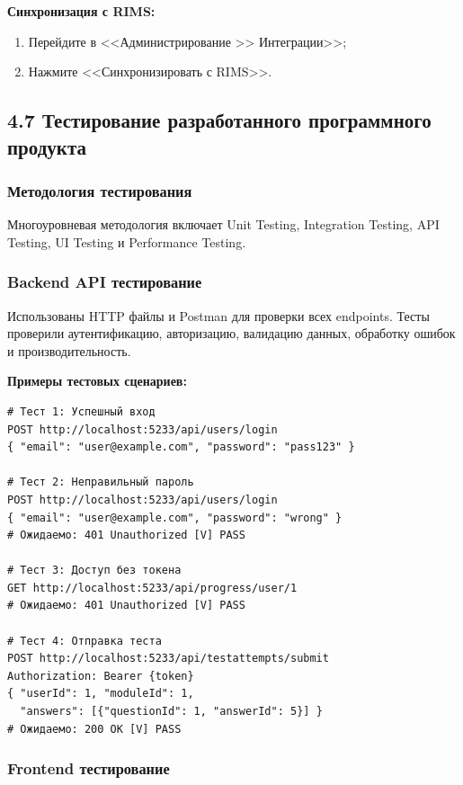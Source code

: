 \textbf{Синхронизация с RIMS:}
\begin{enumerate}
    \item Перейдите в <<Администрирование >> Интеграции>>;
    \item Нажмите <<Синхронизировать с RIMS>>.
\end{enumerate}


\subsection{4.7 Тестирование разработанного программного продукта}

\subsubsection{Методология тестирования}

Многоуровневая методология включает Unit Testing, Integration Testing, API Testing, UI Testing и Performance Testing.

\subsubsection{Backend API тестирование}

Использованы HTTP файлы и Postman для проверки всех endpoints. Тесты проверили аутентификацию, авторизацию, валидацию данных, обработку ошибок и производительность.

\textbf{Примеры тестовых сценариев:}

\begin{lstlisting}[basicstyle=\ttfamily\small]
# Тест 1: Успешный вход
POST http://localhost:5233/api/users/login
{ "email": "user@example.com", "password": "pass123" }

# Тест 2: Неправильный пароль
POST http://localhost:5233/api/users/login
{ "email": "user@example.com", "password": "wrong" }
# Ожидаемо: 401 Unauthorized [V] PASS

# Тест 3: Доступ без токена
GET http://localhost:5233/api/progress/user/1
# Ожидаемо: 401 Unauthorized [V] PASS

# Тест 4: Отправка теста
POST http://localhost:5233/api/testattempts/submit
Authorization: Bearer {token}
{ "userId": 1, "moduleId": 1, 
  "answers": [{"questionId": 1, "answerId": 5}] }
# Ожидаемо: 200 OK [V] PASS
\end{lstlisting}

\subsubsection{Frontend тестирование}

